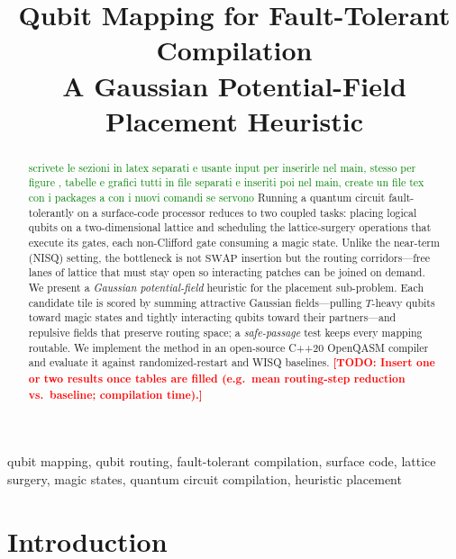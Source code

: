 \documentclass[10pt,conference]{IEEEtran}
\title{%
    Qubit Mapping for Fault-Tolerant Compilation\\[2pt]
    \huge A Gaussian Potential-Field Placement Heuristic%
    \vspace{-7pt}
}
\author{%

    \IEEEauthorblockN{
        Omitted for blind review \IEEEauthorrefmark{1},
       
    }
    \IEEEauthorblockA{
        \IEEEauthorrefmark{1}
          Omitted for blind review\\
          Omitted for blind review\\
          Omitted for blind review
    }
}
\theoremstyle{definition}
\theoremstyle{remark}
\newcommand{\SWAP}{\mathrm{SWAP}}
\newcommand{\todo}[1]{\textcolor{red}{\textbf{[TODO: #1]}}}
\begin{document}
\maketitle


\begin{abstract}
\textcolor{green}{scrivete le sezioni in latex separati e usante input per inserirle nel main, stesso per figure , tabelle e grafici tutti in file separati e inseriti poi nel main, create un file tex con i packages a con i nuovi comandi se servono }
Running a quantum circuit fault-tolerantly on a surface-code processor reduces
to two coupled tasks: placing logical qubits on a two-dimensional lattice and
scheduling the lattice-surgery operations that execute its gates, each
non-Clifford gate consuming a magic state. Unlike the near-term (NISQ) setting,
the bottleneck is not $\SWAP{}$ insertion but the routing corridors---free lanes
of lattice that must stay open so interacting patches can be joined on demand. We present a \emph{Gaussian
potential-field} heuristic for the placement sub-problem. Each candidate tile is
scored by summing attractive Gaussian fields---pulling $T$-heavy qubits toward
magic states and tightly interacting qubits toward their partners---and
repulsive fields that preserve routing space; a \emph{safe-passage} test keeps
every mapping routable. We implement the method in an open-source C++20 OpenQASM
compiler and evaluate it against randomized-restart and WISQ
baselines.
\todo{Insert one or two results once tables are filled (e.g.\ mean
routing-step reduction vs.\ baseline; compilation time).}
\end{abstract}

\begin{IEEEkeywords}
qubit mapping, qubit routing, fault-tolerant compilation, surface code,
lattice surgery, magic states, quantum circuit compilation, heuristic placement
\end{IEEEkeywords}

\section{Introduction}
\label{sec:intro}
\end{document}
